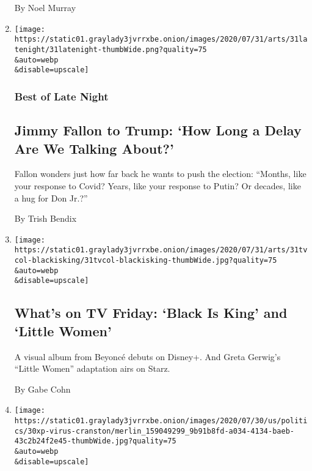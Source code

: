 \begin{enumerate}
  By Noel Murray
\item
  \href{/2020/07/31/arts/television/late-night-trump-delay-election.html}{}

  \texttt{[image: https://static01.graylady3jvrrxbe.onion/images/2020/07/31/arts/31latenight/31latenight-thumbWide.png?quality=75\\\&auto=webp\\\&disable=upscale]}

  \hypertarget{best-of-late-night}{%
  \subsubsection{Best of Late Night}\label{best-of-late-night}}

  \hypertarget{jimmy-fallon-to-trump-how-long-a-delay-are-we-talking-about}{%
  \subsection{Jimmy Fallon to Trump: `How Long a Delay Are We Talking
  About?'}\label{jimmy-fallon-to-trump-how-long-a-delay-are-we-talking-about}}

  Fallon wonders just how far back he wants to push the election:
  ``Months, like your response to Covid? Years, like your response to
  Putin? Or decades, like a hug for Don Jr.?''

  By Trish Bendix
\item
  \href{/2020/07/31/arts/television/whats-on-tv-friday-black-is-king-and-little-women.html}{}

  \texttt{[image: https://static01.graylady3jvrrxbe.onion/images/2020/07/31/arts/31tvcol-blackisking/31tvcol-blackisking-thumbWide.jpg?quality=75\\\&auto=webp\\\&disable=upscale]}

  \hypertarget{whats-on-tv-friday-black-is-king-and-little-women}{%
  \subsection{What's on TV Friday: `Black Is King' and `Little
  Women'}\label{whats-on-tv-friday-black-is-king-and-little-women}}

  A visual album from Beyoncé debuts on Disney+. And Greta Gerwig's
  ``Little Women'' adaptation airs on Starz.

  By Gabe Cohn
\item
  \href{/2020/07/31/arts/television/bryan-cranston-coronavirus-plasma.html}{}

  \texttt{[image: https://static01.graylady3jvrrxbe.onion/images/2020/07/30/us/politics/30xp-virus-cranston/merlin\_159049299\_9b91b8fd-a034-4134-baeb-43c2b24f2e45-thumbWide.jpg?quality=75\\\&auto=webp\\\&disable=upscale]}


\end{enumerate}
